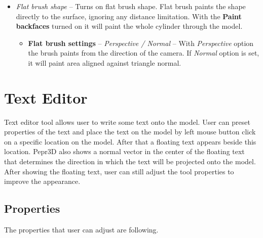 \begin{itemize}
\item \textit{Flat brush shape} -- Turns on flat brush shape. Flat brush paints  the shape directly to the surface, ignoring any distance limitation. With the \textbf{Paint backfaces} turned on it will paint the whole cylinder through the model.

\begin{itemize}
\item \textbf{Flat brush settings} -- \textit{Perspective / Normal} -- With \textit{Perspective} option the brush paints from the direction of the camera. If \textit{Normal} option is set, it will paint area aligned against triangle normal.
\end{itemize}

\end{itemize}


\section{Text Editor}
Text editor tool allows user to write some text onto the model. User can preset properties of the text and place the text on the model by left mouse button click on a specific location on the model. After that a floating text appears beside this location. Pepr3D also shows a normal vector in the center of the floating text that determines the direction in which the text will be projected onto the model. After showing the floating text, user can still adjust the tool properties to improve the appearance.

\subsection{Properties}
The properties that user can adjust are following.

